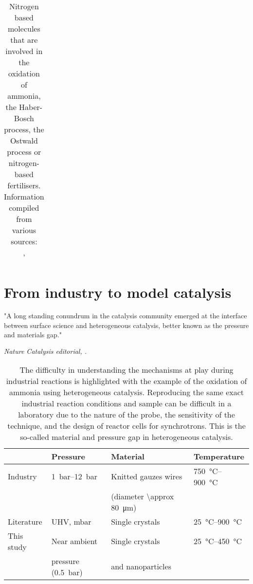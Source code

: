 \begin{landscape}
\begin{table}[!htb]
{\begin{tabular}{@{}l|l|lll|l|l|ll@{}}
    \end{tabular}%
    }
    \caption{
        Nitrogen based molecules that are involved in the oxidation of ammonia, \\
        the Haber-Bosch process, the Ostwald process or nitrogen-based fertilisers.\\
        Information compiled from various sources: \\
        \cite{Thiemann2000, HARRISON2001, Baerns2005, Imbihl2007, Hatscher2008}, \\
        \cite{Davidson2009, Resta2020a,Borodin2021,Pottbacker2022}
    }
    \label{tab:NitrogenGases}
\end{table}
\end{landscape}

\section{From industry to model catalysis}

\epigraph{"A long standing conundrum in the catalysis community emerged at the interface between surface science and heterogeneous catalysis, better known as the pressure and materials gap."}{\textit{Nature Catalysis editorial, \cite*{NatureEditorial2018}.}}

\begin{table}[!htb]
    \centering
    \begin{tabular}{l|l|l|l}
    \toprule
                & Pressure    & Material                         &     Temperature \\
    \midrule
    Industry   & \qtyrange{1}{12}{\bar} & Knitted gauzes wires   & \qtyrange{750}{900}{\degreeCelsius} \\
               &              & (diameter \qty{\approx 80}{\um}) & \\
    \midrule
    Literature & UHV, mbar    & Single crystals                  & \qtyrange{25}{900}{\degreeCelsius} \\
    \midrule
    This study & Near ambient & Single crystals                  & \qtyrange{25}{450}{\degreeCelsius} \\
               & pressure (\qty{0.5}{\bar})  & and nanoparticles & \\
    \bottomrule
    \end{tabular}
    \caption{
        The difficulty in understanding the mechanisms at play during industrial reactions is highlighted with the example of the oxidation of ammonia using heterogeneous catalysis.
        Reproducing the same exact industrial reaction conditions \parencite{Hatscher2008} and sample can be difficult in a laboratory due to the nature of the probe, the sensitivity of the technique, and the design of reactor cells for synchrotrons.
        This is the so-called material and pressure gap in heterogeneous catalysis.
    }
    \label{tab:Gap}
\end{table}

